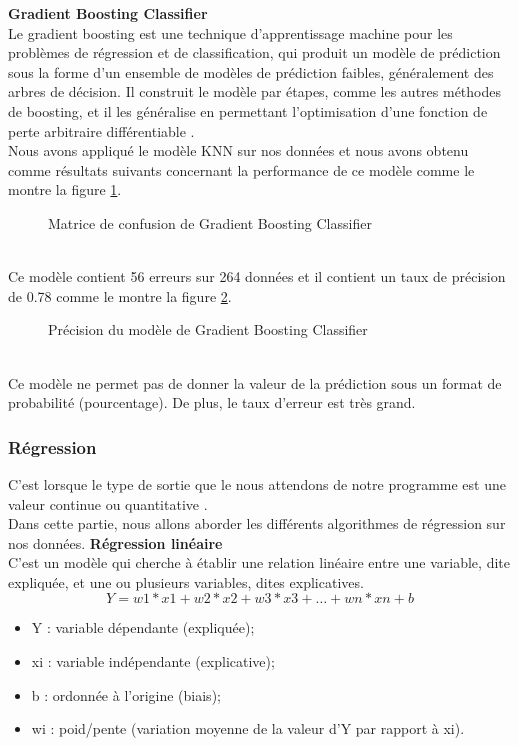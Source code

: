 \textbf{Gradient Boosting Classifier} \\
Le gradient boosting est une technique d'apprentissage machine pour les problèmes de régression et de classification, qui produit un modèle de prédiction sous la forme d'un ensemble de modèles de prédiction faibles, généralement des arbres de décision. Il construit le modèle par étapes, comme les autres méthodes de boosting, et il les généralise en permettant l'optimisation d'une fonction de perte arbitraire différentiable \cite{GradientBoostingClassifier}.\\
   Nous avons appliqué le modèle KNN sur nos données et nous avons obtenu comme résultats suivants concernant la performance de ce modèle comme le montre la figure \ref{fig:ConfusionGRadientBoostingClassifier}.
     \begin{figure}[htpb]
    \centering
    \caption{Matrice de confusion de Gradient Boosting Classifier}
    \label{fig:ConfusionGRadientBoostingClassifier}
    \end{figure}
    \\
Ce modèle contient 56 erreurs sur 264 données et il contient un taux de précision de 0.78 comme le montre la figure     \ref{fig:ConfusionMatrixGRadientBoostingClassifierPrecision}.
   \begin{figure}[htpb]
    \centering
    \caption{Précision du modèle de Gradient Boosting Classifier}
    \label{fig:ConfusionMatrixGRadientBoostingClassifierPrecision}
    \end{figure}
    \\
    Ce modèle ne permet pas de donner la valeur de la prédiction sous un format de probabilité (pourcentage). De plus, le taux d’erreur est très grand.
    \newpage
    



\newpage
    \subsubsection{Régression}
    C’est lorsque le type de sortie que le nous attendons de notre programme est une valeur continue ou quantitative \cite{RegressionGloabal}.\\
    Dans cette partie, nous allons aborder les différents algorithmes de régression sur nos données.
\textbf{Régression linéaire} \\
C'est un modèle qui cherche à établir une relation linéaire entre une variable, dite expliquée, et une ou plusieurs variables, dites explicatives.
\[Y= w1*x1 + w2*x2 + w3*x3 + … + wn*xn + b\]
\begin{itemize}
    \item Y : variable dépendante (expliquée);
    \item xi : variable indépendante (explicative);
    \item b : ordonnée à l’origine (biais);
    \item wi : poid/pente (variation moyenne de la valeur d'Y par rapport à xi).
\end{itemize}

